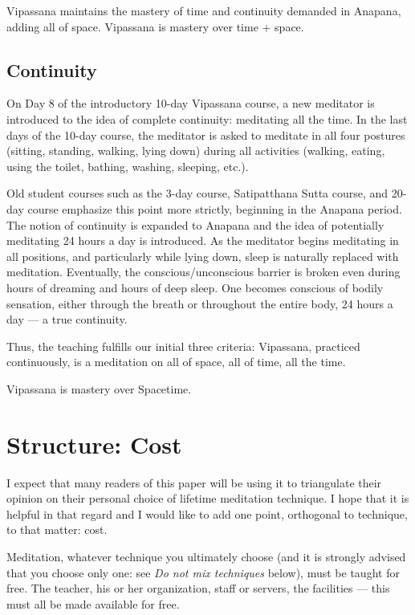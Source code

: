 \documentclass[a4paper, amsfonts, amssymb, amsmath, reprint, showkeys, nofootinbib, twoside]{revtex4-1}
\begin{document}
Vipassana maintains the mastery of time and continuity demanded in Anapana, adding
all of space. Vipassana is mastery over time + space.

\subsection{Continuity}

On Day 8 of the introductory 10-day Vipassana course, a new meditator is introduced
to the idea of complete continuity: meditating all the time. In the last days of the
10-day course, the meditator is asked to meditate in all four postures (sitting,
standing, walking, lying down) during all activities (walking, eating, using the
toilet, bathing, washing, sleeping, etc.).

Old student courses such as the 3-day course, Satipatthana Sutta course, and 20-day
course emphasize this point more strictly, beginning in the Anapana period. The
notion of continuity is expanded to Anapana and the idea of potentially meditating 24
hours a day is introduced. As the meditator begins meditating in all positions, and
particularly while lying down, sleep is naturally replaced with
meditation. Eventually, the conscious/unconscious barrier is broken even during
hours of dreaming and hours of deep sleep. One becomes conscious of bodily sensation,
either through the breath or throughout the entire body, 24 hours a day --- a true
continuity.

Thus, the teaching fulfills our initial three criteria: Vipassana, practiced
continuously, is a meditation on all of space, all of time, all the time.

Vipassana is mastery over Spacetime.

\section{Structure: Cost}

I expect that many readers of this paper will be using it to triangulate their
opinion on their personal choice of lifetime meditation technique. I hope that it is
helpful in that regard and I would like to add one point, orthogonal to technique, to
that matter: cost.

Meditation, whatever technique you ultimately choose (and it is strongly advised that
you choose only one: see \textit{Do not mix techniques} below), must be taught for
free. The teacher, his or her organization, staff or servers, the facilities --- this
must all be made available for free.
\end{document}
